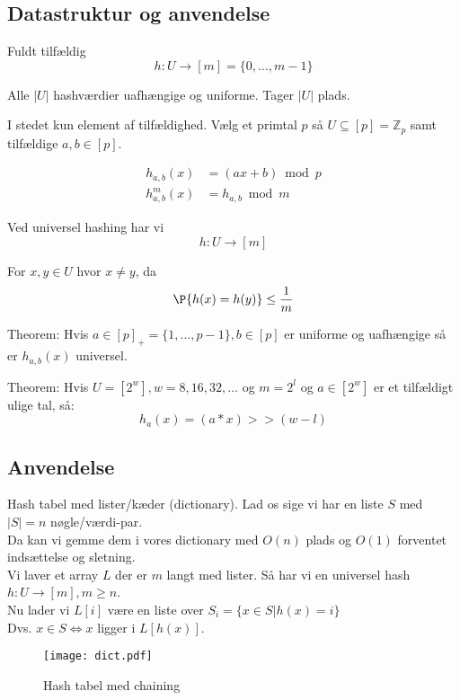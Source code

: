 \subsection{Datastruktur og anvendelse}
Fuldt tilfældig
$$
  h: U \rightarrow [m] = \{ 0, \dots, m-1 \}
$$

Alle $|U|$ hashværdier uafhængige og uniforme. Tager $|U|$ plads.

I stedet kun element af tilfældighed. Vælg et primtal $p$ så $U \subseteq [p] = \mathbb Z_p$ samt tilfældige $a, b \in [p]$.

\begin{align*}
  h_{a, b}(x)   &= (ax + b) \bmod p\\
  h_{a, b}^m(x) &= h_{a, b} \bmod m
\end{align*}


Ved universel hashing har vi
$$
h : U \rightarrow [m]
$$

For $x, y \in U$ hvor $x \neq y$, da
$$
\P{h(x) = h(y)} \leq \frac{1}{m}
$$

Theorem: Hvis $a \in [p]_+ = \{1, \dots, p-1 \}, b \in [p]$ er uniforme og uafhængige så er $h_{a, b}(x)$ universel.

Theorem: Hvis $U = [2^w], w = 8, 16, 32, \dots$ og $m = 2^l$ og $a \in [2^w]$ er et tilfældigt ulige tal, så:
$$
h_a(x) = (a*x) >> (w - l)
$$


\subsection{Anvendelse}

Hash tabel med lister/kæder (dictionary). Lad os sige vi har en liste $S$ med $|S| = n$ nøgle/værdi-par.\\

Da kan vi gemme dem i vores dictionary med $O(n)$ plads og $O(1)$ forventet indsættelse og sletning.\\

Vi laver et array $L$ der er $m$ langt med lister. Så har vi en universel hash $h : U \rightarrow [m], m \geq n$.\\

Nu lader vi $L[i]$ være en liste over $S_i = \{ x \in S | h(x) = i \}$\\

Dvs. $x \in S \Longleftrightarrow x$ ligger i $L[h(x)]$.

\begin{figure}[H]
  \begin{center}
  \texttt{[image: dict.pdf]}
  \end{center}
  \caption{Hash tabel med chaining}
  \label{fig:hash}
\end{figure}

